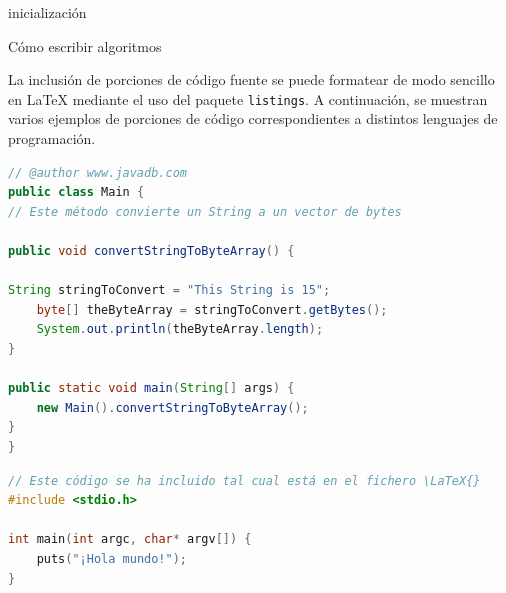 \IncMargin{1em}
\begin{algorithm}
\LinesNumbered
\SetAlgoLined


inicialización\;

\caption{Cómo escribir algoritmos}\label{alg:como}
\end{algorithm}\DecMargin{1em}








\newpage %
La inclusión de porciones de código fuente se puede formatear de modo sencillo en \LaTeX{} mediante el uso del paquete \texttt{listings}. A continuación, se muestran varios ejemplos de porciones de código correspondientes a distintos lenguajes de programación.


\begin{lstlisting}[language=Java,caption={[Código fuente en Java]Ejemplo de código fuente en lenguaje Java},label=lst:java]
// @author www.javadb.com
public class Main {    
// Este método convierte un String a un vector de bytes

public void convertStringToByteArray() {

String stringToConvert = "This String is 15";      
	byte[] theByteArray = stringToConvert.getBytes();        
	System.out.println(theByteArray.length);        
}

public static void main(String[] args) {
	new Main().convertStringToByteArray();
}
}
\end{lstlisting}


\begin{lstlisting}[style=ruled,language=C,caption={Ejemplo de código fuente en lenguaje C},label=lst:codC]
// Este código se ha incluido tal cual está en el fichero \LaTeX{}
#include <stdio.h>

int main(int argc, char* argv[]) {
	puts("¡Hola mundo!");
}
\end{lstlisting}


